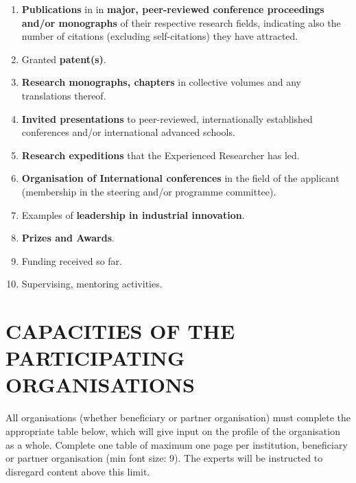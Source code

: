 \documentclass[a4paper,11pt]{article}
\begin{document}
\begin{enumerate}
\item \textbf{Publications} in in \textbf{major, peer-reviewed conference proceedings and/or monographs} of their respective research fields, indicating also the number of citations (excluding self-citations) they have attracted.
\item Granted \textbf{patent(s)}.
\item \textbf{Research monographs, chapters} in collective volumes and any translations thereof.
\item \textbf{Invited presentations} to peer-reviewed, internationally established conferences and/or international advanced schools.
\item \textbf{Research expeditions} that the Experienced Researcher has led. 
\item \textbf{Organisation of International conferences} in the field of the applicant (membership in the steering and/or programme committee).
\item Examples of \textbf{leadership in industrial innovation}.
\item \textbf{Prizes and Awards}.
\item Funding received so far.
\item Supervising, mentoring activities.
\end{enumerate}


\newpage
\section{CAPACITIES OF THE PARTICIPATING ORGANISATIONS}
\label{sec:capacities}

All organisations (whether beneficiary or partner organisation) must complete the appropriate table below, which will give input on the profile of the organisation as a whole. Complete one table of maximum one page per institution, beneficiary or partner organisation (min font size: 9). The experts will be instructed to disregard content above this limit.
\vspace{\baselineskip}
\end{document}
